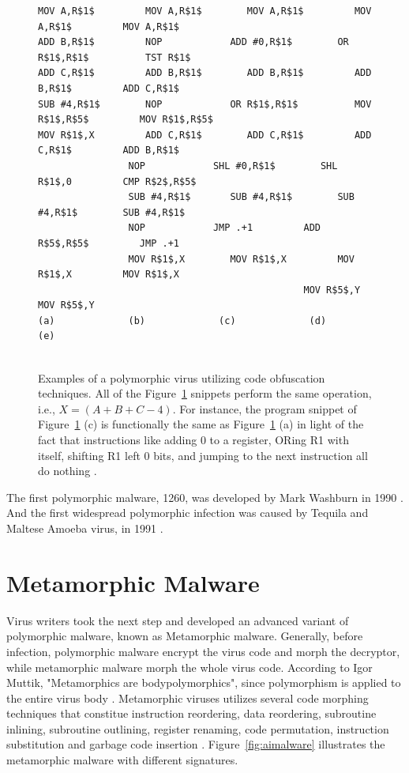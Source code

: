 \begin{figure}
  \centering
\begin{lstlisting}[language=myasm]
MOV A,R$1$         MOV A,R$1$        MOV A,R$1$         MOV A,R$1$         MOV A,R$1$
ADD B,R$1$         NOP            ADD #0,R$1$        OR R$1$,R$1$          TST R$1$
ADD C,R$1$         ADD B,R$1$        ADD B,R$1$         ADD B,R$1$         ADD C,R$1$
SUB #4,R$1$        NOP            OR R$1$,R$1$          MOV R$1$,R$5$         MOV R$1$,R$5$
MOV R$1$,X         ADD C,R$1$        ADD C,R$1$         ADD C,R$1$         ADD B,R$1$
                NOP            SHL #0,R$1$        SHL R$1$,0         CMP R$2$,R$5$
                SUB #4,R$1$       SUB #4,R$1$        SUB #4,R$1$        SUB #4,R$1$
                NOP            JMP .+1         ADD R$5$,R$5$         JMP .+1
                MOV R$1$,X        MOV R$1$,X         MOV R$1$,X         MOV R$1$,X
                                               MOV R$5$,Y         MOV R$5$,Y
(a)             (b)             (c)             (d)             (e)


\end{lstlisting}
    \caption[Examples of a polymorphic virus.]{Examples of a polymorphic virus utilizing code obfuscation techniques. All of the Figure~\ref{fig:polyvirus} snippets perform the same operation, i.e.,  $X = (A + B + C - 4)$. For instance, the program snippet of Figure~\ref{fig:polyvirus} (c) is functionally the same as Figure~\ref{fig:polyvirus} (a) in light of the fact that instructions like adding 0 to a register, ORing R1 with itself, shifting R1 left 0 bits, and jumping to the next instruction all do nothing \cite{bib19}.}
    \label{fig:polyvirus}
\end{figure}

    
The first polymorphic malware, 1260, was developed by Mark Washburn in 1990 \cite{bib15}. And the first widespread polymorphic infection was caused by Tequila and Maltese Amoeba virus, in 1991 \cite{bib14}.

\section{Metamorphic Malware} 

Virus writers took the next step and developed an advanced variant of polymorphic malware, known as Metamorphic malware. Generally, before infection, polymorphic malware encrypt the virus code and morph the decryptor, while metamorphic malware morph the whole virus code. According to Igor Muttik, "Metamorphics are bodypolymorphics", since polymorphism is applied to the entire virus body \cite{bib22}. Metamorphic viruses utilizes several code morphing techniques that constitue instruction reordering, data reordering, subroutine inlining, subroutine outlining, register renaming, code permutation, instruction substitution and garbage code insertion \cite{bib23}. Figure~\ref{fig:aimalware} illustrates the metamorphic malware with different signatures.

